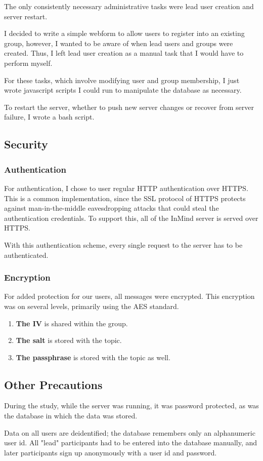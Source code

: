       The only consistently necessary administrative tasks were lead user creation
      and server restart.

      I decided to write a simple webform to allow users to register
      into an existing group,
      however, I wanted to be aware of when lead users and groups were created.
      Thus, I left lead user creation as a manual task that I would have to
      perform myself.

      For these tasks, which involve modifying user and group membership,
      I just wrote javascript scripts I could run to manipulate the database
      as necessary.

      To restart the server,
      whether to push new server changes or recover from server failure,
      I wrote a bash script.

    \subsection{Security}
      \subsubsection{Authentication}
        For authentication, I chose to user regular HTTP authentication over HTTPS.
        This is a common implementation, since the SSL protocol of HTTPS
        protects against man-in-the-middle
        eavesdropping attacks that could steal the authentication credentials.
        To support this, all of the InMind server is served over HTTPS.

        With this authentication scheme,
        every single request to the server has to be authenticated.

      \subsubsection{Encryption}
        For added protection for our users, all messages were encrypted.
        This encryption was on several levels, primarily using the AES standard.

        \begin{enumerate}
        \item \textbf{The IV} is shared within the group.
        \item \textbf{The salt} is stored with the topic.
        \item \textbf{The passphrase} is stored with the topic as well.
        \end{enumerate}

      \subsection{Other Precautions}
      During the study, while the server was running, it was password protected,
      as was the database in which the data was stored.

      Data on all users are deidentified;
      the database remembers only an alphanumeric user id.
      All "lead" participants had to be entered into the database manually,
      and later participants sign up anonymously with a user id and password.
